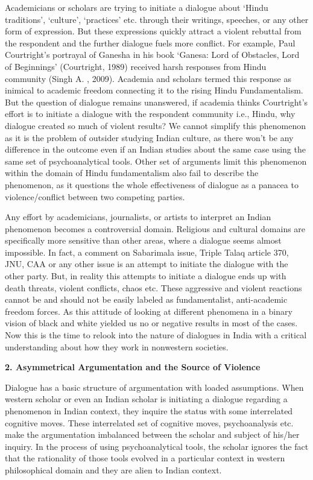 \begin{multicols}{2}
\noi
Academicians or scholars are trying to initiate a dialogue about ‘Hindu traditions’, ‘culture’,
‘practices’ etc. through their writings, speeches, or any other form of expression. But these
expressions quickly attract a violent rebuttal from the respondent and the further dialogue fuels
more conflict. For example, Paul Courtright’s portrayal of Ganesha in his book ‘Ganesa: Lord of
Obstacles, Lord of Beginnings’ (Courtright, 1989) received harsh responses from Hindu
community (Singh A. , 2009). Academia and scholars termed this response as inimical to
academic freedom connecting it to the rising Hindu Fundamentalism. But the question of dialogue
remains unanswered, if academia thinks Courtright’s effort is to initiate a dialogue with the
respondent community i.e., Hindu, why dialogue created so much of violent results? We cannot
simplify this phenomenon as it is the problem of outsider studying Indian culture, as there won’t
be any difference in the outcome even if an Indian studies about the same case using the same set
of psychoanalytical tools. Other set of arguments limit this phenomenon within the domain of
Hindu fundamentalism also fail to describe the phenomenon, as it questions the whole
effectiveness of dialogue as a panacea to violence/conflict between two competing parties.

\noi
Any effort by academicians, journalists, or artists to interpret an Indian phenomenon becomes a
controversial domain. Religious and cultural domains are specifically more sensitive than other
areas, where a dialogue seems almost impossible. In fact, a comment on Sabarimala issue, Triple
Talaq article 370, JNU, CAA or any other issue is an attempt to initiate the dialogue with the
other party. But, in reality this attempts to initiate a dialogue ends up with death threats, violent
conflicts, chaos etc. These aggressive and violent reactions cannot be and should not be easily
labeled as fundamentalist, anti-academic freedom forces. As this attitude of looking at different
phenomena in a binary vision of black and white yielded us no or negative results in most of the
cases. Now this is the time to relook into the nature of dialogues in India with a critical
understanding about how they work in nonwestern societies.

\noi
{\large \bfseries 2. Asymmetrical Argumentation and the Source of Violence}

\noi
Dialogue has a basic structure of argumentation with loaded assumptions. When western scholar
or even an Indian scholar is initiating a dialogue regarding a phenomenon in Indian context, they inquire the status with some interrelated cognitive moves. These interrelated set of cognitive
moves, psychoanalysis etc. make the argumentation imbalanced between the scholar and subject
of his/her inquiry. In the process of using psychoanalytical tools, the scholar ignores the fact that
the rationality of those tools evolved in a particular context in western philosophical domain and
they are alien to Indian context.


\end{multicols}
